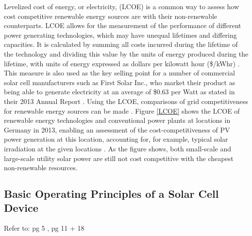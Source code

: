 Levelized cost of energy, or electricity, (LCOE) is a common way to assess how cost competitive renewable energy sources are with their non-renewable counterparts. LCOE allows for the measurement of the performance of different power generating technologies, which may have unequal lifetimes and differing capacities. It is calculated by summing all costs incurred during the lifetime of the technology and dividing this value by the units of energy produced during the lifetime, with units of energy expressed as dollars per kilowatt hour (\$/kWhr) \cite{LCOE2}. This measure is also used as the key selling point for a number of commercial solar cell manufacturers such as First Solar Inc., who market their product as being able to generate electricity at an average of \$0.63 per Watt as stated in their 2013  Annual Report \cite{first_solar}. Using the LCOE, comparisons of grid competitiveness for renewable energy sources can be made \cite{LCOE2}. Figure \ref{LCOE} shows the LCOE of renewable energy technologies and conventional power plants at locations in Germany in 2013, enabling an assessment of the cost-competitiveness of PV power generation at this location, accounting for, for example, typical solar irradiation at the given locations \cite{LCOE}. As the figure shows, both small-scale and large-scale utility solar power are still not cost competitive with the cheapest non-renewable resources.\\




\subsection{Basic Operating Principles of a Solar Cell Device}\label{basic_PV}
Refer to: pg 5 \cite{spatial_resolved_book}, pg 11 + 18 \cite{PV_Goetzberger}\\


